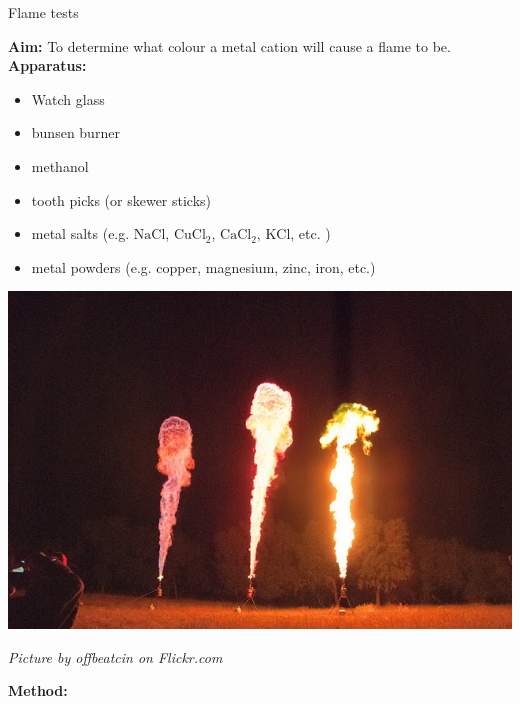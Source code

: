 \begin{i_experiment}{Flame tests}{
            \nopagebreak
            \label{m38741*eip-699}\noindent{}\textbf{Aim:}\newline
    To determine what colour a metal cation will cause a flame to be. \\
\label{m38741*eip-6991}\noindent{}\textbf{Apparatus:}\newline
\begin{minipage}{.5\textwidth}
\begin{itemize}[noitemsep]
\item Watch glass
\item bunsen burner
\item methanol
\item tooth picks (or skewer sticks)
\item metal salts (e.g. $\text{NaCl}$, ${\text{CuCl}}_{2}$, ${\text{CaCl}}_{2}$, $\text{KCl}$, etc. )
\item metal powders (e.g. copper, magnesium, zinc, iron, etc.)
\end{itemize}
\end{minipage}
\begin{minipage}{.5\textwidth}
\begin{center}
 \includegraphics[width=.8\textwidth]{photos/offbeatcin.jpg}\par
\textit{Picture by offbeatcin on Flickr.com}
\end{center}
\end{minipage}
\label{m38741*eip-6992}\noindent{}\textbf{Method:}\newline
}
\end{i_experiment}
